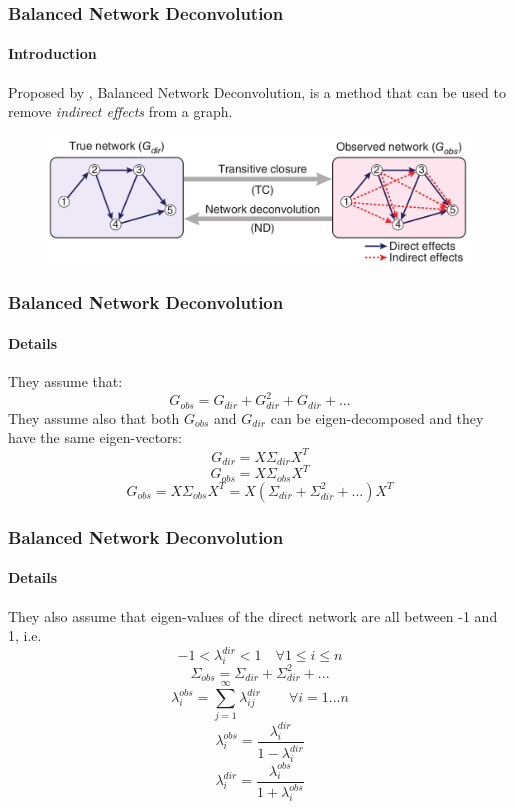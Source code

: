 \documentclass{beamer}
\begin{document}
\begin{frame}
    \frametitle{Balanced Network Deconvolution}
    \framesubtitle{Introduction}
    Proposed by , Balanced Network Deconvolution, is 
    a method that can be used to remove \textit{indirect effects} from a graph.
    \begin{figure}
        \centering
        \includegraphics[width=\textwidth]{figures/nd.png}
        \caption*{ \cite{feizi2013network}}
    \end{figure}
\end{frame}
\begin{frame}
    \frametitle{Balanced Network Deconvolution}
    \framesubtitle{Details}
    They assume that:
    \begin{equation}
        \label{indirect_effects}
        G_{obs} = G_{dir} + G_{dir}^2 + G_{dir} + ...
    \end{equation}
    They assume also that both $G_{obs}$ and $G_{dir}$ can be 
    eigen-decomposed and they have the same eigen-vectors:
    \begin{equation}
        G_{dir} = X \Sigma_{dir} X^T
    \end{equation}
    \begin{equation}
        G_{obs} = X \Sigma_{obs} X^T
    \end{equation}
    \begin{equation}
        G_{obs} = X \Sigma_{obs} X^T = X ( \Sigma_{dir} + \Sigma_{dir}^2 + ...) X^T
    \end{equation}
\end{frame}
\begin{frame}
    \frametitle{Balanced Network Deconvolution}
    \framesubtitle{Details}
    They also assume that eigen-values of the direct network are all
    between -1 and 1, i.e. 
    \begin{equation}
        -1 < \lambda^{dir}_i < 1 \quad \forall 1 \le i \le n
    \end{equation}
    \begin{equation}
        \Sigma_{obs} = \Sigma_{dir} + \Sigma_{dir}^2 + ...
    \end{equation}
    \begin{equation}
        \lambda_i^{obs} = \sum_{j=1}^{\infty} \lambda^{dir}_{ij} \quad\quad \forall i = 1 ... n
    \end{equation}
    \begin{equation}
        \lambda_i^{obs} = \frac{\lambda_i^{dir}}{1 - \lambda_i^{dir}}
    \end{equation}
    \begin{equation}
       \lambda_i^{dir} = \frac{\lambda_i^{obs}}{1 + \lambda_i^{obs}} 
    \end{equation}
\end{frame}
\end{document}

